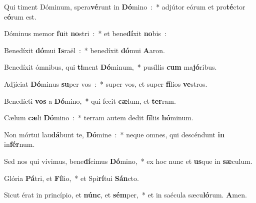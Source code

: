 \item Qui timent Dóminum, spera\textbf{vé}\-runt in \textbf{Dó}\-mino~:~* adjútor eórum et pro\textbf{té}\-ctor e\textbf{ó}\-rum est.
\item Dóminus memor \textbf{fu}\-it \textbf{no}\-stri~:~* et bene\textbf{dí}\-xit \textbf{no}bis~:
\item Benedíxit \textbf{dó}\-mui \textbf{Is}\-raël~:~* benedíxit \textbf{dó}\-mui \textbf{A}aron.
\item Benedíxit ómnibus, qui \textbf{ti}\-ment \textbf{Dó}\-minum,~* pu\-síl\-lis \textbf{cum} ma\textbf{jó}ribus.
\item Adjíciat \textbf{Dó}\-minus \textbf{su}\-per vos~:~* super vos, et super \textbf{fí}\-li\-os \textbf{ve}stros.
\item Benedícti \textbf{vos} a \textbf{Dó}\-mino,~* qui fecit \textbf{cæ}\-lum, et \textbf{ter}ram.
\item Cælum \textbf{cæ}\-li \textbf{Dó}\-mino~:~* terram autem dedit \textbf{fí}\-liis \textbf{hó}minum.
\item Non mórtui lau\textbf{dá}\-bunt te, \textbf{Dó}\-mine~:~* neque omnes, qui descéndunt \textbf{in} in\textbf{fér}num.
\item Sed nos qui vívimus, bene\textbf{dí}\-cimus \textbf{Dó}\-mino,~* ex hoc nunc et \textbf{us}\-que in \textbf{sæ}culum.
\item Glória \textbf{Pá}\-tri, et \textbf{Fí}\-lio,~* et Spi\textbf{rí}\-tui \textbf{Sán}cto.
\item Sicut érat in princípio, et \textbf{núnc}, et \textbf{sém}\-per,~* et in saé\-cu\-la sæcu\textbf{ló}\-rum. \textbf{A}men.
